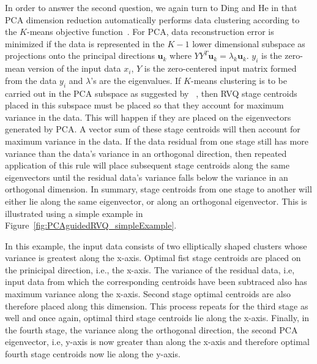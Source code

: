 \documentclass{article}
\begin{document}
In order to answer the second question, we again turn to Ding and He in that PCA dimension reduction automatically performs data clustering according to the $K$-means objective function~\cite{2004_CNF_KmeansVsPCA_DingHe}.  For PCA, data reconstruction error is minimized if the data is represented in the $K-1$ lower dimensional subspace as projections onto the principal directions $\mathbf{u}_k$ where $YY^T\mathbf{u}_k=\lambda_k\mathbf{u}_k$.  $y_i$ is the zero-mean version of the input data $x_i$, $Y$ is the zero-centered input matrix formed from the data $y_i$ and $\lambda$'s are the eigenvalues.  If $K$-means clustering is to be carried out in the PCA subspace as suggested by~\cite{2004_CNF_KmeansVsPCA_DingHe} , then RVQ stage centroids placed in this subspace must be placed so that they account for maximum variance in the data.  This will happen if they are placed on the eigenvectors generated by PCA.  A vector sum of these stage centroids will then account for maximum variance in the data.  If the data residual from one stage still has more variance than the data's variance in an orthogonal direction, then repeated application of this rule will place subsequent stage centroids along the same eigenvectors until the residual data's variance falls below the variance in an orthogonal dimension.  In summary, stage centroids from one stage to another will either lie along the same eigenvector, or along an orthogonal eigenvector.  This is illustrated using a simple example in Figure~\ref{fig:PCAguidedRVQ_simpleExample}.  

In this example, the input data consists of two elliptically shaped clusters whose variance is greatest along the x-axis.  Optimal fist stage centroids are placed on the prinicipal direction, i.e., the x-axis.  The variance of the residual data, i.e, input data from which the corresponding centroids have been subtraced also has maximum variance along the x-axis.  Second stage optimal centroids are also therefore placed along this dimension.  This process repeats for the third stage as well and once again, optimal third stage centroids lie along the x-axis.  Finally, in the fourth stage, the variance along the orthogonal direction, the second PCA eigenvector, i.e, y-axis is now greater than along the x-axis and therefore optimal fourth stage centroids now lie along the y-axis. 
\end{document}
